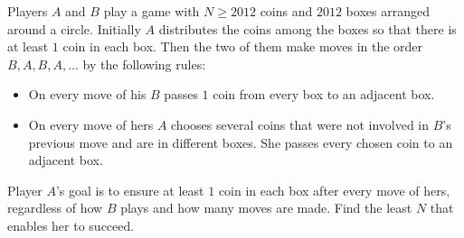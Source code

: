 Players $A$ and $B$ play a game with $N \geq 2012$ coins and $2012$ boxes arranged around a circle. Initially $A$ distributes the coins among the boxes so that there is at least $1$ coin in each box. Then the two of them make moves in the order $B, A, B, A, \ldots$ by the following rules:

\begin{itemize}
  \item On every move of his $B$ passes $1$ coin from every box to an adjacent box.
  \item On every move of hers $A$ chooses several coins that were not involved in $B$'s previous move and are in different boxes. She passes every chosen coin to an adjacent box.
\end{itemize}

Player $A$'s goal is to ensure at least $1$ coin in each box after every move of hers, regardless of how $B$ plays and how many moves are made. Find the least $N$ that enables her to succeed.
